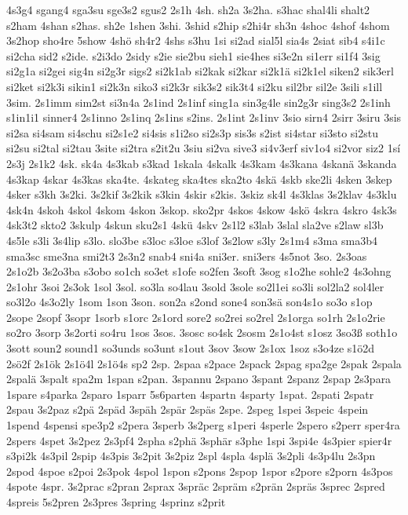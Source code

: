 {4s3g4
sgang4
sga3su
sge3s2
sgus2
2s1h
4sh.
sh2a
3s2ha.
s3hac
shal4li
shalt2
s2ham
4shan
s2has.
sh2e
1shen
3shi.
3shid
s2hip
s2hi4r
sh3n
4shoc
4shof
4shom
3s2hop
sho4re
5show
4shö
sh4r2
4shs
s3hu
1si
si2ad
sial5l
sia4s
2siat
sib4
s4i1c
si2cha
sid2
s2ide.
s2i3do
2sidy
s2ie
sie2bu
sieh1
sie4hes
si3e2n
si1err
si1f4
3sig
si2g1a
si2gei
sig4n
si2g3r
sigs2
si2k1ab
si2kak
si2kar
si2k1ä
si2k1el
siken2
sik3erl
si2ket
si2k3i
sikin1
si2k3n
siko3
si2k3r
sik3s2
sik3t4
si2ku
sil2br
sil2e
3sili
s1ill
3sim.
2s1imm
sim2st
si3n4a
2s1ind
2s1inf
sing1a
sin3g4le
sin2g3r
sing3s2
2s1inh
s1in1i1
sinner4
2s1inno
2s1inq
2s1ins
s2ins.
2s1int
2s1inv
3sio
sirn4
2sirr
3siru
3sis
si2sa
si4sam
si4schu
si2s1e2
si4sis
s1i2so
si2s3p
sis3s
s2ist
si4star
si3sto
si2stu
si2su
si2tal
si2tau
3site
si2tra
s2it2u
3siu
si2va
sive3
si4v3erf
siv1o4
si2vor
siz2
1sí
2s3j
2s1k2
4sk.
sk4a
4s3kab
s3kad
1skala
4skalk
4s3kam
4s3kana
4skanä
3skanda
4s3kap
4skar
4s3kas
ska4te.
4skateg
ska4tes
ska2to
4skä
4skb
ske2li
4sken
3skep
4sker
s3kh
3s2ki.
3s2kif
3s2kik
s3kin
4skir
s2kis.
3skiz
sk4l
4s3klas
3s2klav
4s3klu
4sk4n
4skoh
4skol
4skom
4skon
3skop.
sko2pr
4skos
4skow
4skö
4skra
4skro
4sk3s
4sk3t2
skto2
3skulp
4skun
sku2s1
4skü
4skv
2s1l2
s3lab
3slal
sla2ve
s2law
sl3b
4s5le
s3li
3s4lip
s3lo.
slo3be
s3loc
s3loe
s3lof
3s2low
s3ly
2s1m4
s3ma
sma3b4
sma3sc
sme3na
smi2t3
2s3n2
snab4
sni4a
sni3er.
sni3ers
4s5not
3so.
2s3oas
2s1o2b
3s2o3ba
s3obo
so1ch
so3et
s1ofe
so2fen
3soft
3sog
s1o2he
sohle2
4s3ohng
2s1ohr
3soi
2s3ok
1sol
3sol.
so3la
so4lau
3sold
3sole
so2l1ei
so3li
sol2la2
sol4ler
so3l2o
4s3o2ly
1som
1son
3son.
son2a
s2ond
sone4
son3sä
son4s1o
so3o
s1op
2sope
2sopf
3sopr
1sorb
s1orc
2s1ord
sore2
so2rei
so2rel
2s1orga
so1rh
2s1o2rie
so2ro
3sorp
3s2orti
so4ru
1sos
3sos.
3sosc
so4sk
2sosm
2s1o4st
s1osz
3so3ß
soth1o
3sott
soun2
sound1
so3unds
so3unt
s1out
3sov
3sow
2s1ox
1soz
s3o4ze
s1ö2d
2sö2f
2s1ök
2s1ö4l
2s1ö4s
sp2
2sp.
2spaa
s2pace
2spack
2spag
spa2ge
2spak
2spala
2spalä
3spalt
spa2m
1span
s2pan.
3spannu
2spano
3spant
2spanz
2spap
2s3para
1spare
s4parka
2sparo
1sparr
5s6parten
4spartn
4sparty
1spat.
2spati
2spatr
2spau
3s2paz
s2pä
2späd
3späh
2spär
2späs
2spe.
2speg
1spei
3speic
4spein
1spend
4spensi
spe3p2
s2pera
3sperb
3s2perg
s1peri
4sperle
2spero
s2perr
sper4ra
2spers
4spet
3s2pez
2s3pf4
2spha
s2phä
3sphär
s3phe
1spi
3spi4e
4s3pier
spier4r
s3pi2k
4s3pil
2spip
4s3pis
3s2pit
3s2piz
2spl
4spla
4splä
3s2pli
4s3p4lu
2s3pn
2spod
4spoe
s2poi
2s3pok
4spol
1spon
s2pons
2spop
1spor
s2pore
s2porn
4s3pos
4spote
4spr.
3s2prac
s2pran
2sprax
3spräc
2spräm
s2prän
2spräs
3sprec
2spred
4spreis
5s2pren
2s3pres
3spring
4sprinz
s2prit
}
